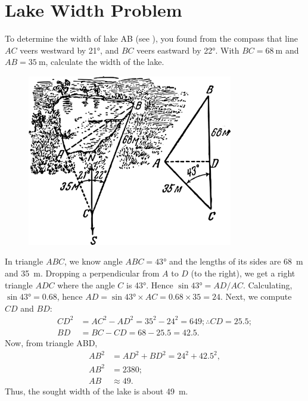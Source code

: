 \section{Lake Width Problem}
\label{sec-5.6}

To determine the width of lake AB (see ), you found from the compass that line $AC$ veers westward by \ang{21}, and $BC$ veers eastward by \ang{22}. With $BC = \SI{68}{\meter}$ and $AB = \SI{35}{\meter}$, calculate the width of the lake.

\begin{figure}[h!]
\centering
\includegraphics[width=0.8\textwidth]{figures/ch-05/fig-094.pdf}
\end{figure}

\ans In triangle $ABC$, we know angle $ABC = \ang{43}$ and the lengths of its sides are \SI{68}{\meter} and \SI{35}{\meter}. Dropping a perpendicular from $A$ to $D$ (to the right), we get a right triangle $ADC$ where the angle $C$ is \ang{43}. Hence $\sin \ang{43} = AD/AC$. Calculating, $\sin \ang{43} = 0.68$, hence $AD = \sin \ang{43} \times AC  = 0.68 \times 35 = 24$. Next, we compute $CD$ and $BD$: 
\begin{align*}%
CD^{2} & = AC^{2} - AD^{2} = 35^{2} - 24^{2} = 649; \therefore CD = 25.5;\\
BD & = BC - CD =  68 - 25.5 = 42.5. 
\end{align*}
Now, from triangle ABD, 
\begin{align*}%
AB^{2} & = AD^{2} + B{D}^2  = 24^{2} + 42.5^{2}, \\
AB^{2} & = 2380;\\
AB & \approx 49.
\end{align*}
Thus, the sought width of the lake is about \SI{49}{\meter}.


